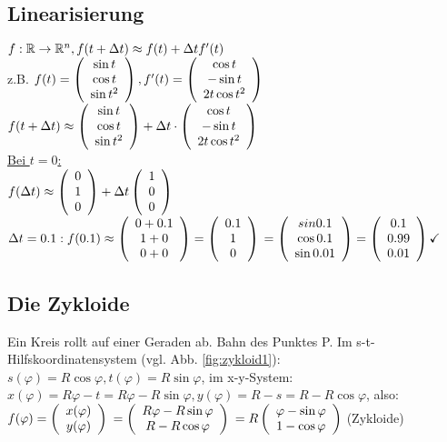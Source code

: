 \renewcommand{\ldate}{2015-10-22}

\subsection{Linearisierung}
$f:\R \rightarrow \R^n, f(t+\Dt )\approx f(t) + \Dt f'(t) $\\
z.B. $ f(t)= \vektor{\sin t\\ \cos t\\ \sin t^2}, f'(t)=\vektor{\cos t\\-\sin t\\2 t \cos t^2}$\\
$f(t+\Dt) \approx \vektor{\sin t\\ \cos t\\ \sin t^2} + \Dt \cdot \vektor{\cos t\\-\sin t\\2 t \cos t^2}$\\
\underline{Bei $t=0$:}\\
$f(\Dt) \approx \vektor{0\\1\\0} + \Dt \vektor{1\\0\\0}$\\
$\Dt=0.1: f(0.1)\approx \vektor{0+0.1\\1+0\\0+0}=\vektor{0.1\\1\\0}$
$= \vektor{sin 0.1\\ \cos 0.1\\ \sin 0.01} = \vektor{0.1\\ 0.99\\ 0.01} \checkmark $

\subsection{Die Zykloide}
Ein Kreis rollt auf einer Geraden ab. Bahn des Punktes P. Im s-t-Hilfskoordinatensystem (vgl. Abb. \ref{fig:zykloid1}): 
$s(\varphi) = R \cos \varphi, t(\varphi) = R \sin \varphi$, im x-y-System: 
$x(\varphi) = R \varphi - t = R\varphi - R \sin \varphi, y(\varphi)=R-s = R-R \cos \varphi$, also: \\
$f(\varphi) = \vektor{x(\varphi)\\y(\varphi)}$
$= \vektor{R\varphi - R \sin \varphi\\R-R \cos \varphi}$
$=R \vektor{\varphi - \sin \varphi\\1-\cos \varphi}$ (Zykloide)

